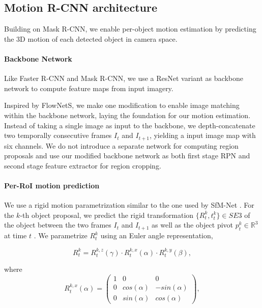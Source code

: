 
\subsection{Motion R-CNN architecture}

Building on Mask R-CNN, we enable per-object motion estimation by predicting the 3D motion of each detected object
in camera space.

\paragraph{Backbone Network}
Like Faster R-CNN and Mask R-CNN, we use a ResNet variant as backbone network to compute feature maps from input imagery.

Inspired by FlowNetS, we make one modification to enable image matching within the backbone network,
laying the foundation for our motion estimation. Instead of taking a single image as input to the backbone,
we depth-concatenate two temporally consecutive frames $I_t$ and $I_{t+1}$, yielding a input image map with six channels.
We do not introduce a separate network for computing region proposals and use our modified backbone network
as both first stage RPN and second stage feature extractor for region cropping.

\paragraph{Per-RoI motion prediction}
We use a rigid motion parametrization similar to the one used by SfM-Net \cite{Byravan:2017:SNL}.
For the $k$-th object proposal, we predict the rigid transformation $\{R_t^k, t_t^k\}\in SE3$
of the object between the two frames $I_t$ and $I_{t+1}$ as well as the object pivot $p_t^k \in \mathbb{R}^3$ at time $t$ .
We parametrize ${R_t^k}$ using an Euler angle representation,

\begin{equation}
R_t^k = R_t^{k,z}(\gamma) \cdot R_t^{k,x}(\alpha) \cdot R_t^{k,y}(\beta),
\end{equation}

where
\begin{equation}
R_t^{k,x}(\alpha) =
\begin{pmatrix}
  1 & 0 & 0 \\
  0 & cos(\alpha) & -sin(\alpha) \\
  0 & sin(\alpha) & cos(\alpha)
\end{pmatrix},
\end{equation}


